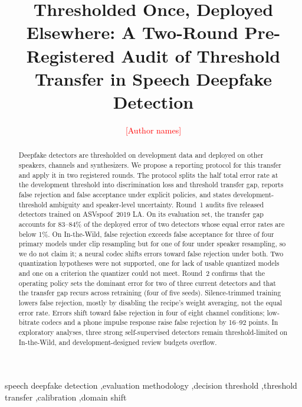 \documentclass[review,authoryear]{elsarticle}
\newcommand{\todo}[1]{\textcolor{red}{[#1]}}
\begin{document}
\begin{frontmatter}
\title{Thresholded Once, Deployed Elsewhere: A Two-Round Pre-Registered Audit of Threshold Transfer in Speech Deepfake Detection}
\author{\todo{Author names}}
\address{\todo{Affiliations and corresponding-author email}}

\begin{abstract}
Deepfake detectors are thresholded on development data and deployed on other speakers, channels and
synthesizers. We propose a reporting protocol for this transfer and apply it in two registered rounds. The protocol
splits the half total error rate at the development threshold into discrimination loss and threshold transfer gap,
reports false rejection and false acceptance under explicit policies, and states development-threshold ambiguity and
speaker-level uncertainty. Round~1 audits five released detectors trained on ASVspoof~2019 LA. On its evaluation set,
the transfer gap accounts for 83--84\% of the deployed error of two detectors whose equal error rates are below 1\%. On
In-the-Wild, false rejection exceeds false acceptance for three of four primary models under clip resampling but for
one of four under speaker resampling, so we do not claim it; a neural codec shifts errors toward false rejection under
both. Two quantization hypotheses were not supported, one for lack of usable quantized models and one on a criterion
the quantizer could not meet. Round~2 confirms that the operating policy sets the dominant error for two of three
current detectors and that the transfer gap recurs across retraining (four of five seeds). Silence-trimmed training
lowers false rejection, mostly by disabling the recipe's weight averaging, not the equal error rate. Errors shift
toward false rejection in four of eight channel conditions; low-bitrate codecs and a phone impulse response raise false
rejection by 16--92 points. In exploratory analyses, three strong self-supervised detectors remain threshold-limited
on In-the-Wild, and development-designed review budgets overflow.
\end{abstract}

\begin{keyword}
speech deepfake detection \sep evaluation methodology \sep decision threshold \sep threshold transfer \sep calibration
\sep domain shift
\end{keyword}
\end{frontmatter}
\end{document}
